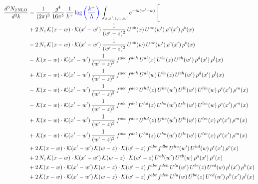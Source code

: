 \documentclass[9pt]{article}
\numberwithin{equation}{section}
\begin{document}
\begin{align}
\frac{d^{3}N_{2\,\mathrm{NLO}}}{d^{3}k} & = \frac{1}{(2\pi)^{3}}\,\frac{g^{4}}{16\pi^{5}}\,\frac{1}{k^{+}}\,{\color{blue}\log{\left(\frac{k^{+}}{\Lambda}\right)}}\,\int_{x,x',z,w,w'}e^{-ik(w'-w)}\,\Bigg[
\notag \\ &+2\,N_{c}\,\mathcal{K}(x-w)\cdot\mathcal{K}(x'-w')\,\frac{1}{(w'-z)^{2}}\,U^{ab}(x)\,U^{ac}(w')\,\rho^{c}(x')\,\rho^{b}(x)\notag\\
&-2\,N_{c}\,\mathcal{K}(x-w)\cdot\mathcal{K}(x'-w')\,\frac{1}{(w'-z)^{2}}\,U^{ab}(w)\,U^{ac}(w')\,\rho^{c}(x')\,\rho^{b}(x)\notag\\
&-\,\mathcal{K}(x-w)\cdot\mathcal{K}(x'-w')\,\frac{1}{(w'-z)^{2}}\,f^{abc}\,f^{deh}\,U^{al}(x)\,U^{be}(z)\,U^{ch}(w')\,\rho^{d}(x')\,\rho^{l}(x)\notag\\
&+\,\mathcal{K}(x-w)\cdot\mathcal{K}(x'-w')\,\frac{1}{(w'-z)^{2}}\,f^{abc}\,f^{deh}\,U^{al}(w)\,U^{be}(z)\,U^{ch}(w')\,\rho^{d}(x')\,\rho^{l}(x)\notag \\ & -\,\mathcal{K}(x-w)\cdot\mathcal{K}(x'-w')\,\frac{1}{(w'-z)^{2}}\,f^{abc}\,f^{dea}\,U^{hd}(z)\,U^{he}(w')\,U^{lb}(w')\,U^{lm}(w)\,\rho^{c}(x')\,\rho^{m}(x)\notag\\
&-\,\mathcal{K}(x-w)\cdot\mathcal{K}(x'-w')\,\frac{1}{(w'-z)^{2}}\,f^{abc}\,f^{deb}\,U^{hd}(z)\,U^{ha}(w')\,U^{le}(w')\,U^{lm}(w)\,\rho^{c}(x')\,\rho^{m}(x)\notag\\
&+\,\mathcal{K}(x-w)\cdot\mathcal{K}(x'-w')\,\frac{1}{(w'-z)^{2}}\,f^{abc}\,f^{dea}\,U^{hd}(z)\,U^{he}(w')\,U^{lb}(w')\,U^{lm}(x)\,\rho^{c}(x')\,\rho^{m}(x)\notag\\
&+\,\mathcal{K}(x-w)\cdot\mathcal{K}(x'-w')\,\frac{1}{(w'-z)^{2}}\,f^{abc}\,f^{deb}\,U^{hd}(z)\,U^{ha}(w')\,U^{le}(w')\,U^{lm}(x)\,\rho^{c}(x')\,\rho^{m}(x)\notag\\
&+2\,\mathcal{K}(x-w)\cdot\mathcal{K}(x'-w')\,\mathcal{K}(w-z)\cdot\mathcal{K}(w'-z)\,f^{abc}\,f^{dbe}\,U^{ha}(w')\,U^{hd}(w)\,\rho^{c}(x')\,\rho^{e}(x)\notag\\
&+2\,N_{c}\,\mathcal{K}(x-w)\cdot\mathcal{K}(x'-w')\,\mathcal{K}(w-z)\cdot\mathcal{K}(w'-z)\,U^{ab}(w')\,U^{cb}(w)\,\rho^{a}(x')\,\rho^{c}(x)\notag \\ & +2\,\mathcal{K}(x-w)\cdot\mathcal{K}(x'-w')\,\mathcal{K}(w-z)\cdot\mathcal{K}(w'-z)\,f^{abc}\,f^{deh}\,U^{la}(w')\,U^{be}(z)\,U^{cd}(w)\,\rho^{l}(x')\,\rho^{h}(x)\notag\\
&+2\,\mathcal{K}(x-w)\cdot\mathcal{K}(x'-w')\,\mathcal{K}(w-z)\cdot\mathcal{K}(w'-z)\,f^{abc}\,f^{deh}\,U^{la}(w)\,U^{be}(z)\,U^{cd}(w')\,\rho^{h}(x')\,\rho^{l}(x)\notag\\

\end{align}
\end{document}
